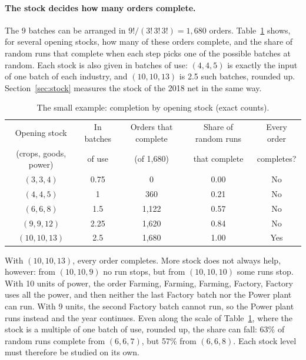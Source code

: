 \documentclass[11pt]{article}
\begin{document}
\paragraph{The stock decides how many orders complete.} The 9 batches can be arranged in $9!/(3!\,3!\,3!)=1{,}680$ orders. Table~\ref{tab:toystock} shows, for several opening stocks, how many of these orders complete, and the share of random runs that complete when each step picks one of the possible batches at random. Each stock is also given in batches of use: $(4,4,5)$ is exactly the input of one batch of each industry, and $(10,10,13)$ is 2.5 such batches, rounded up. Section~\ref{sec:stock} measures the stock of the 2018 net in the same way.

\begin{table}[htbp]
\centering\small
\caption{The small example: completion by opening stock (exact counts).}
\label{tab:toystock}
\begin{tabular}{@{}ccccc@{}}
\toprule
Opening stock & In batches & Orders that complete & Share of random runs & Every order\\
(crops, goods, power) & of use & (of 1{,}680) & that complete & completes?\\
\midrule
$(3,3,4)$ & 0.75 & 0 & 0.00 & No\\
$(4,4,5)$ & 1 & 360 & 0.21 & No\\
$(6,6,8)$ & 1.5 & 1{,}122 & 0.57 & No\\
$(9,9,12)$ & 2.25 & 1{,}620 & 0.84 & No\\
$(10,10,13)$ & 2.5 & 1{,}680 & 1.00 & Yes\\
\bottomrule
\end{tabular}
\end{table}

With $(10,10,13)$, every order completes. More stock does not always help, however: from $(10,10,9)$ no run stops, but from $(10,10,10)$ some runs stop. With 10 units of power, the order Farming, Farming, Farming, Factory, Factory uses all the power, and then neither the last Factory batch nor the Power plant can run. With 9 units, the second Factory batch cannot run, so the Power plant runs instead and the year continues. Even along the scale of Table~\ref{tab:toystock}, where the stock is a multiple of one batch of use, rounded up, the share can fall: 63\% of random runs complete from $(6,6,7)$, but 57\% from $(6,6,8)$. Each stock level must therefore be studied on its own.
\end{document}
